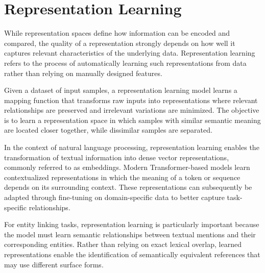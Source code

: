 \section{Representation Learning}

While representation spaces define how information can be encoded and compared, the quality of a representation strongly depends on how well it captures relevant characteristics of the underlying data. Representation learning refers to the process of automatically learning such representations from data rather than relying on manually designed features.

Given a dataset of input samples, a representation learning model learns a mapping function that transforms raw inputs into representations where relevant relationships are preserved and irrelevant variations are minimized. The objective is to learn a representation space in which samples with similar semantic meaning are located closer together, while dissimilar samples are separated.

In the context of natural language processing, representation learning enables the transformation of textual information into dense vector representations, commonly referred to as embeddings. Modern Transformer-based models learn contextualized representations in which the meaning of a token or sequence depends on its surrounding context. These representations can subsequently be adapted through fine-tuning on domain-specific data to better capture task-specific relationships.

For entity linking tasks, representation learning is particularly important because the model must learn semantic relationships between textual mentions and their corresponding entities. Rather than relying on exact lexical overlap, learned representations enable the identification of semantically equivalent references that may use different surface forms.
